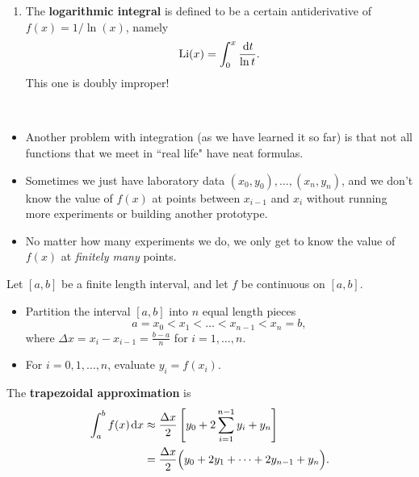 \begin{remark}
\begin{itemize}
\begin{enumerate}
\item The \textbf{logarithmic integral} is defined to be a certain antiderivative of $f(x) = 1/\ln (x)$, namely
\begin{equation*}
\operatorname{Li}(x) = \int_0^x\frac{\mkern 2mu \mathrm{d} t}{\ln t}.
\end{equation*}
This one is doubly improper!
\end{enumerate}
\end{itemize}
\end{remark}


\begin{remark}\,
\begin{itemize}
\item Another problem with integration (as we have learned it so far) is that not all functions that we meet in ``real life" have neat formulas.
\item Sometimes we just have laboratory data $(x_0, y_0), \dots, (x_n,y_n)$, and we don't know the value of $f(x)$ at points between $x_{i-1}$ and $x_i$ without running more experiments or building another prototype.
\item No matter how many experiments we do, we only get to know the value of $f(x)$ at \textit{finitely many} points.
\end{itemize}
\end{remark}

\begin{definition}
Let $[a,b]$ be a finite length interval, and let $f$ be continuous on $[a,b]$.
\begin{itemize}
\item Partition the interval $[a,b]$ into $n$ equal length pieces
\begin{equation*}
a=x_0 < x_1 <\dots < x_{n-1} < x_n = b,
\end{equation*}
where $\Delta x = x_i - x_{i-1} = \frac{b-a}{n}$ for $i=1,\dots, n$.
\item For $i=0,1,\dots, n$, evaluate $y_i = f(x_i)$.
\end{itemize}
The \textbf{trapezoidal approximation} is
\begin{equation*}
\begin{split}
\int_a^bf(x)\mkern 2mu \mathrm{d} x &\approx \frac{\Delta x}{2}\left[y_0 + 2\sum_{i=1}^{n-1} y_i + y_n\right]\\
&= \frac{\Delta x}{2}\Big(y_0 + 2y_1 + \dots + 2y_{n-1} + y_n\Big).
\end{split}
\end{equation*}
\end{definition}

